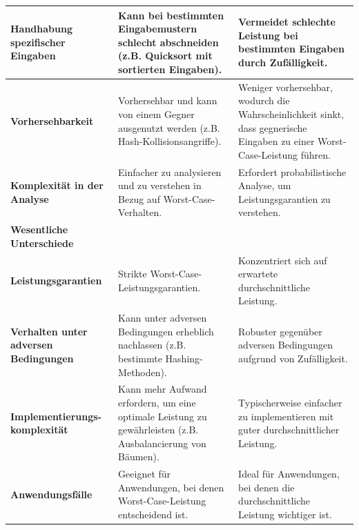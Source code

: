 \documentclass[
../AuD-Zusammenfassung.tex,
]
{subfiles}
\begin{document}
\begin{longtable}{| p{4cm} | p{6cm} | p{6cm} |}
    \hline
    \textbf{Handhabung spezifischer Eingaben} & Kann bei bestimmten Eingabemustern schlecht abschneiden (z.B. Quicksort mit sortierten Eingaben). & Vermeidet schlechte Leistung bei bestimmten Eingaben durch Zufälligkeit. \\
    \hline
    \textbf{Vorhersehbarkeit} & Vorhersehbar und kann von einem Gegner ausgenutzt werden (z.B. Hash-Kollisionsangriffe). & Weniger vorhersehbar, wodurch die Wahrscheinlichkeit sinkt, dass gegnerische Eingaben zu einer Worst-Case-Leistung führen. \\
    \hline
    \textbf{Komplexität in der Analyse} & Einfacher zu analysieren und zu verstehen in Bezug auf Worst-Case-Verhalten. & Erfordert probabilistische Analyse, um Leistungsgarantien zu verstehen. \\
    \hline
    \rowcolor{orange!30}\textbf{Wesentliche Unterschiede} & & \\
    \hline
    \textbf{Leistungsgarantien} & Strikte Worst-Case-Leistungsgarantien. & Konzentriert sich auf erwartete durchschnittliche Leistung. \\
    \hline
    \textbf{Verhalten unter adversen Bedingungen} & Kann unter adversen Bedingungen erheblich nachlassen (z.B. bestimmte Hashing-Methoden). & Robuster gegenüber adversen Bedingungen aufgrund von Zufälligkeit. \\
    \hline
    \textbf{Implementierungs-komplexität} & Kann mehr Aufwand erfordern, um eine optimale Leistung zu gewährleisten (z.B. Ausbalancierung von Bäumen). & Typischerweise einfacher zu implementieren mit guter durchschnittlicher Leistung. \\
    \hline
    \textbf{Anwendungsfälle} & Geeignet für Anwendungen, bei denen Worst-Case-Leistung entscheidend ist. & Ideal für Anwendungen, bei denen die durchschnittliche Leistung wichtiger ist. \\
    \hline
\end{longtable}
\end{document}
